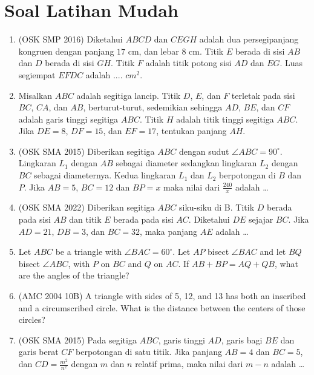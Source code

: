 \documentclass[12pt]{scrartcl}
\begin{document}
\section{Soal Latihan Mudah}
\begin{enumerate}
    \item (OSK SMP 2016) Diketahui $ABCD$ dan $CEGH$ adalah dua persegipanjang kongruen dengan panjang $17$ cm, dan lebar $8$ cm. Titik $E$ berada di sisi $AB$ dan $D$ berada di sisi $GH$. Titik $F$ adalah titik potong sisi $AD$ dan $EG$. Luas segiempat $EFDC$ adalah .... $cm^2$.

    \item Misalkan $ABC$ adalah segitiga lancip. Titik $D$, $E$, dan $F$ terletak pada sisi $BC$, $CA$, dan $AB$, berturut-turut, sedemikian sehingga $AD$, $BE$, dan $CF$ adalah garis tinggi segitiga $ABC$. Titik $H$ adalah titik tinggi segitiga $ABC$. Jika $DE = 8$, $DF = 15$, dan $EF = 17$, tentukan panjang $AH$.

    \item (OSK SMA 2015) Diberikan segitiga $ABC$ dengan sudut $\angle ABC = 90^\circ$. Lingkaran $L_1$ dengan $AB$ sebagai diameter sedangkan lingkaran $L_2$ dengan $BC$ sebagai diameternya. Kedua lingkaran $L_1$ dan $L_2$ berpotongan di $B$ dan $P$. Jika $AB = 5$, $BC = 12$ dan $BP = x$ maka nilai dari $\frac{240}{x}$ adalah \ldots

    \item (OSK SMA 2022) Diberikan segitiga $ABC$ siku-siku di B. Titik $D$ berada pada sisi $AB$ dan titik $E$ berada pada sisi $AC$. Diketahui $DE$ sejajar $BC$. Jika $AD = 21$, $DB = 3$, dan $BC = 32$, maka panjang $AE$ adalah \dots
    
    \item Let $ABC$ be a triangle with $\angle BAC = 60^\circ$. Let $AP$ bisect $\angle BAC$ and let $BQ$ bisect $\angle ABC$, with $P$ on $BC$ and $Q$ on $AC$. If $AB + BP = AQ + QB$, what are the angles of the triangle?

    \item (AMC 2004 10B) A triangle with sides of 5, 12, and 13 has both an inscribed and a circumscribed circle. What is the distance between the centers of those circles?

    \item (OSK SMA 2015) Pada segitiga $ABC$, garis tinggi $AD$, garis bagi $BE$ dan garis berat $CF$ berpotongan di satu titik. Jika panjang $AB = 4$ dan $BC = 5$, dan $CD = \frac{m^2}{n^2}$ dengan $m$ dan $n$ relatif prima, maka nilai dari $m - n$ adalah \ldots


\end{enumerate}
\end{document}

